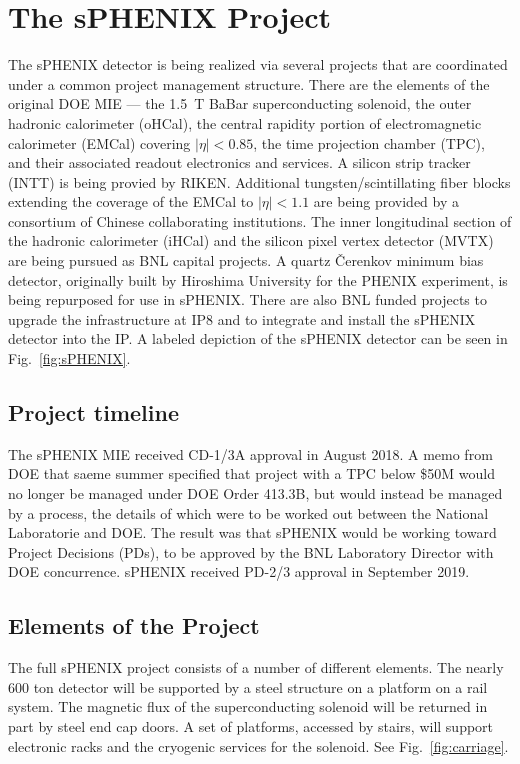 \chapter{The sPHENIX Project}
\label{chap:project}

The sPHENIX detector is being realized via several projects that are
coordinated under a common project management structure.  There are
the elements of the original DOE MIE --- the 1.5~T BaBar
superconducting solenoid, the outer hadronic calorimeter (oHCal), the
central rapidity portion of electromagnetic calorimeter (EMCal)
covering $|\eta| < 0.85$, the time projection chamber (TPC), and their
associated readout electronics and services.  A silicon strip tracker
(INTT) is being provied by RIKEN.  Additional tungsten/scintillating
fiber blocks extending the coverage of the EMCal to $|\eta| < 1.1$ are
being provided by a consortium of Chinese collaborating institutions.
The inner longitudinal section of the hadronic calorimeter (iHCal) and
the silicon pixel vertex detector (MVTX) are being pursued as BNL
capital projects.  A quartz \v{C}erenkov minimum bias detector,
originally built by Hiroshima University for the PHENIX experiment, is
being repurposed for use in sPHENIX.  There are also BNL funded
projects to upgrade the infrastructure at IP8 and to integrate and
install the sPHENIX detector into the IP.  A labeled depiction of the
sPHENIX detector can be seen in Fig.~\ref{fig:sPHENIX}.

\section{Project timeline}
\label{sec:timeline}

The sPHENIX MIE received CD-1/3A approval in August 2018.  A memo from
DOE that saeme summer specified that project with a TPC below \$50M
would no longer be managed under DOE Order 413.3B, but would instead
be managed by a process, the details of which were to be worked out
between the National Laboratorie and DOE.  The result was that sPHENIX
would be working toward Project Decisions (PDs), to be approved by the
BNL Laboratory Director with DOE concurrence.  sPHENIX received PD-2/3
approval in September 2019.

\section{Elements of the Project}
\label{sec:elements}

The full sPHENIX project consists of a number of different elements.
The nearly 600 ton detector will be supported by a steel structure on
a platform on a rail system.  The magnetic flux of the superconducting
solenoid will be returned in part by steel end cap doors.  A set of
platforms, accessed by stairs, will support electronic racks and the
cryogenic services for the solenoid.  See Fig.~\ref{fig:carriage}.

